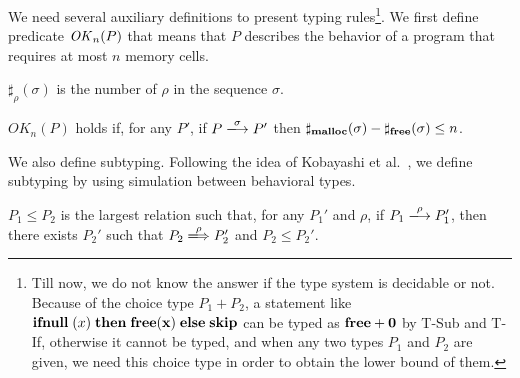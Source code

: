 
We need several auxiliary definitions to present typing
rules\footnote{Till now, we do not know the answer if the type system
  is decidable or not. Because of the choice type $P_1 + P_2$, a
  statement like $\mathbf{ifnull}\;(x) \; \mathbf{then}\; \mathbf{free(x)}\; \mathbf{else}\; \mathbf{skip}$ can be typed
  as $\mathbf{free} + \mathbf{0}$ by T-Sub and T-If, otherwise it cannot be
  typed, and when any two types $P_ 1$ and $P_2$ are given, we need
  this choice type in order to obtain the lower bound of them.}.  We
first define predicate \(\mathit{OK}_n(P)\) that means that \(P\) describes
the behavior of a program that requires at most \(n\) memory cells.

\begin{myDef}[\(\sharp_{\rho}(\sigma)\)]
\label{df:sharf}
\(\sharp_{\rho}(\sigma)\) is the number of \(\rho\) in the sequence
\(\sigma\).
\end{myDef}


\begin{myDef}
\label{df:okn}
\(OK_{n}(P)\) holds if, for any \(P'\), if \(P
\xlongrightarrow{\sigma}P'\) then
\(\sharp_{\mathbf{malloc}}(\sigma)-\sharp_{\mathbf{free}}(\sigma)\le n\).
\end{myDef}

We also define subtyping.  Following the idea of Kobayashi et
al.~\cite{DBLP:journals/tcs/IgarashiK04}, we define subtyping by
using simulation between behavioral types.

 \begin{myDef}[Subtyping]

\(P_1 \le P_2\) is the largest relation such that, for any \(P_1'\)
and \(\rho\), if \(P_1 \xlongrightarrow{\rho} P_1'\), then there
exists \(P_2'\) such that \(P_2 \xLongrightarrow{\rho} P_2'\) and
\(P_2 \le P_2'\).

\label{df:subtype}
\end{myDef}

